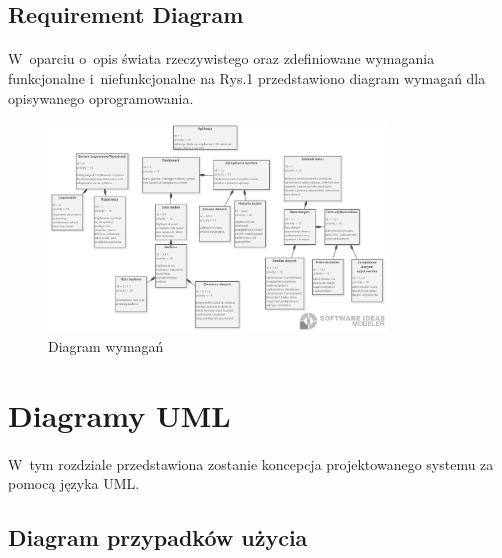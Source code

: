 \documentclass[12pt, letterpaper]{article}
\begin{document}
\subsection{Requirement Diagram}
\paragraph{}		
W~oparciu o~opis świata rzeczywistego oraz zdefiniowane wymagania funkcjonalne i~niefunkcjonalne na Rys.1 przedstawiono diagram wymagań dla opisywanego oprogramowania.
		
\begin{figure}[h]
  \centering
      \includegraphics[width=0.8\textwidth]{reqDiagram}
  \caption{Diagram wymagań}
\end{figure}
		
		
\newpage
\section{Diagramy UML}
\paragraph{}
W~tym rozdziale przedstawiona zostanie koncepcja projektowanego systemu za pomocą języka UML.		
		
		\subsection{Diagram przypadków użycia}
\end{document}
